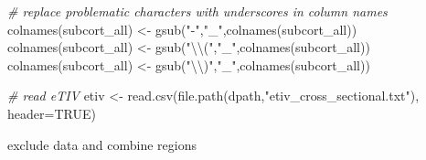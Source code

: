 \documentclass[
]{article}
\newenvironment{Shaded}{\begin{snugshade}}{\end{snugshade}}
\newcommand{\AttributeTok}[1]{\textcolor[rgb]{0.77,0.63,0.00}{#1}}
\newcommand{\CommentTok}[1]{\textcolor[rgb]{0.56,0.35,0.01}{\textit{#1}}}
\newcommand{\ConstantTok}[1]{\textcolor[rgb]{0.00,0.00,0.00}{#1}}
\newcommand{\FunctionTok}[1]{\textcolor[rgb]{0.00,0.00,0.00}{#1}}
\newcommand{\NormalTok}[1]{#1}
\newcommand{\OtherTok}[1]{\textcolor[rgb]{0.56,0.35,0.01}{#1}}
\newcommand{\SpecialCharTok}[1]{\textcolor[rgb]{0.00,0.00,0.00}{#1}}
\newcommand{\StringTok}[1]{\textcolor[rgb]{0.31,0.60,0.02}{#1}}
\begin{document}
\begin{Shaded}
\begin{Highlighting}[]
\CommentTok{\# replace problematic characters with underscores in column names}
\FunctionTok{colnames}\NormalTok{(subcort\_all) }\OtherTok{\textless{}{-}} \FunctionTok{gsub}\NormalTok{(}\StringTok{"{-}"}\NormalTok{,}\StringTok{"\_"}\NormalTok{,}\FunctionTok{colnames}\NormalTok{(subcort\_all))}
\FunctionTok{colnames}\NormalTok{(subcort\_all) }\OtherTok{\textless{}{-}} \FunctionTok{gsub}\NormalTok{(}\StringTok{"}\SpecialCharTok{\textbackslash{}\textbackslash{}}\StringTok{("}\NormalTok{,}\StringTok{"\_"}\NormalTok{,}\FunctionTok{colnames}\NormalTok{(subcort\_all))}
\FunctionTok{colnames}\NormalTok{(subcort\_all) }\OtherTok{\textless{}{-}} \FunctionTok{gsub}\NormalTok{(}\StringTok{"}\SpecialCharTok{\textbackslash{}\textbackslash{}}\StringTok{)"}\NormalTok{,}\StringTok{"\_"}\NormalTok{,}\FunctionTok{colnames}\NormalTok{(subcort\_all))}

\CommentTok{\# read eTIV}
\NormalTok{etiv }\OtherTok{\textless{}{-}} \FunctionTok{read.csv}\NormalTok{(}\FunctionTok{file.path}\NormalTok{(dpath,}\StringTok{"etiv\_cross\_sectional.txt"}\NormalTok{), }\AttributeTok{header=}\ConstantTok{TRUE}\NormalTok{)}
\end{Highlighting}
\end{Shaded}

exclude data and combine regions
\end{document}
